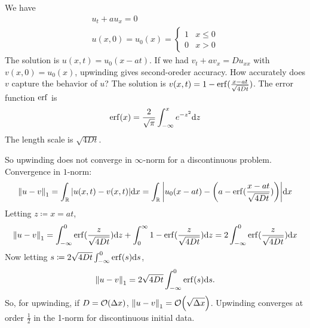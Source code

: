 \documentclass{article}
\newcommand{\Dx}{\Delta x}
\begin{document}
        We have
        \begin{gather*}
            u_t + au_x = 0 \\
            u(x,0) = u_0(x) = \begin{cases}
                1 & x \leq 0 \\
                0 & x > 0
            \end{cases}
        \end{gather*}
        The solution is $u(x,t) = u_0(x - at)$.  If we had $v_t + av_x = Du_{xx}$ with $v(x,0) = u_0(x)$, upwinding gives second-oreder accuracy.  How accurately does $v$ capture the behavior of $u$?  The solution is $v(x,t) = 1 - \erf(\frac{x - at}{\sqrt{4Dt}})$.  The error function $\erf$ is
        \begin{align*}
            \erf(x) = \frac{2}{\sqrt{\pi}}\int_{-\infty}^x e^{-z^2}\dd z
        \end{align*}
        The length scale is $\sqrt{4Dt}$.
        \begin{figure}[ht!]
            \centering
        \end{figure}
        \FloatBarrier
        So upwinding does not converge in $\infty$-norm for a discontinuous problem.  Convergence in $1$-norm:
        \begin{align*}
            \norm{u - v}_1 = \int_{\mathbb{R}}\abs{u(x,t) - v(x,t)}\dd x = \int_{\mathbb{R}}\abs{u_0(x - at) - \qty(a - \erf(\frac{x - at}{\sqrt{4Dt}}))}\dd x
        \end{align*}
        Letting $z \coloneqq x = at$, 
        \begin{align*}
            \norm{u - v}_1 = \int_{-\infty}^0\erf(\frac{z}{\sqrt{4Dt}})\dd z + \int_0^\infty 1 - \erf(\frac{z}{\sqrt{4Dt}})\dd z = 2\int_{-\infty}^0\erf(\frac{z}{\sqrt{4Dt}})\dd x
        \end{align*}
        Now letting $s \coloneqq 2\sqrt{4Dt}\int_{-\infty}^0\erf(s)\dd s$,
        \begin{align*}
            \norm{u - v}_1 = 2\sqrt{4Dt}\int_{-\infty}^0\erf(s)\dd s.
        \end{align*}
        So, for upwinding, if $D = \order{\Dx}$, $\norm{u - v}_1 = \order{\sqrt{\Dx}}$.  Upwinding converges at order $\frac{1}{2}$ in the 1-norm for discontinuous initial data.
\end{document}
